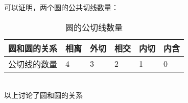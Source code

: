 \documentclass[UTF8]{ctexart}
\begin{document}
    可以证明，两个圆的公共切线数量：\vspace{5pt}
    \begin{table}[h]
        \begin{center}
            \begin{tabular}{l|l|l|l|l|l}
                \hline
                圆和圆的关系\qquad\qquad&相离\qquad\qquad&外切\qquad\qquad&相交\qquad\qquad&内切\qquad\qquad&内含\qquad\qquad\\ \hline
                公切线的数量&4&3&2&1&0\\ \hline
            \end{tabular}
            \caption{圆的公切线数量}
        \end{center}
    \end{table}\\
    以上讨论了圆和圆的关系

\newpage
\end{document}

